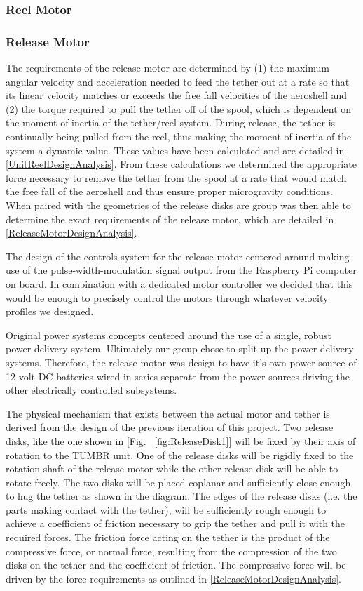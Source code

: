 \subsubsection{Reel Motor}

\subsubsection{Release Motor}

\indent\indent The requirements of the release motor are determined by (1) the maximum angular velocity and acceleration needed to feed the tether out at a rate so that its linear velocity matches or exceeds the free fall velocities of the aeroshell and (2) the torque required to pull the tether off of the spool, which is dependent on the moment of inertia of the tether/reel system. During release, the tether is continually being pulled from the reel, thus making the moment of inertia of the system a dynamic value. These values have been calculated and are detailed in \ref{UnitReelDesignAnalysis}. From these calculations we determined the appropriate force necessary to remove the tether from the spool at a rate that would match the free fall of the aeroshell and thus ensure proper microgravity conditions. When paired with the geometries of the release disks are group was then able to determine the exact requirements of the release motor, which are detailed in \ref{ReleaseMotorDesignAnalysis}.

The design of the controls system for the release motor centered around making use of the pulse-width-modulation signal output from the Raspberry Pi computer on board. In combination with a dedicated motor controller we decided that this would be enough to precisely control the motors through whatever velocity profiles we designed. 

Original power systems concepts centered around the use of a single, robust power delivery system. Ultimately our group chose to split up the power delivery systems. Therefore, the release motor was design to have it's own power source of 12 volt DC batteries wired in series separate from the power sources driving the other electrically controlled subsystems. 

The physical mechanism that exists between the actual motor and tether is derived from the design of the previous iteration of this project. Two release disks, like the one shown in [Fig. ~\ref{fig:ReleaseDisk1}] will be fixed by their axis of rotation to the TUMBR unit. One of the release disks will be rigidly fixed to the rotation shaft of the release motor while the other release disk will be able to rotate freely. The two disks will be placed coplanar and sufficiently close enough to hug the tether as shown in the diagram. The edges of the release disks (i.e. the parts making contact with the tether), will be sufficiently rough enough to achieve a coefficient of friction necessary to grip the tether and pull it with the required forces. The friction force acting on the tether is the product of the compressive force, or normal force, resulting from the compression of the two disks on the tether and the coefficient of friction. The compressive force will be driven by the force requirements as outlined in \ref{ReleaseMotorDesignAnalysis}.

